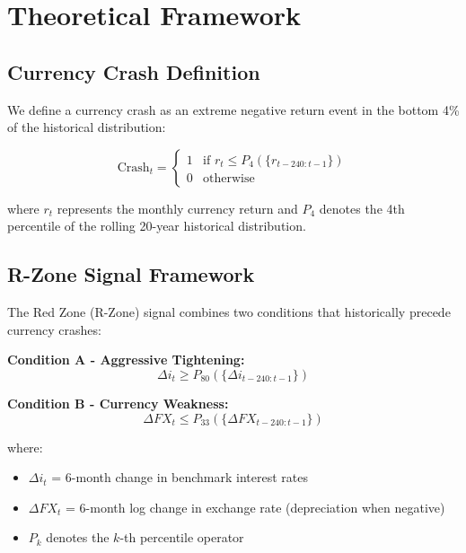 \documentclass[twocolumn,ieee]{arithmaxresearch}
\begin{document}
\section{Theoretical Framework}

\subsection{Currency Crash Definition}

We define a currency crash as an extreme negative return event in the bottom 4\% of the historical distribution:

\begin{equation}
\text{Crash}_t = \begin{cases}
1 & \text{if } r_t \leq P_4(\{r_{t-240:t-1}\}) \\
0 & \text{otherwise}
\end{cases}
\end{equation}

where $r_t$ represents the monthly currency return and $P_4$ denotes the 4th percentile of the rolling 20-year historical distribution.

\subsection{R-Zone Signal Framework}

The Red Zone (R-Zone) signal combines two conditions that historically precede currency crashes:

\textbf{Condition A - Aggressive Tightening:}
\begin{equation}
\Delta i_t \geq P_{80}(\{\Delta i_{t-240:t-1}\})
\end{equation}

\textbf{Condition B - Currency Weakness:}
\begin{equation}
\Delta FX_t \leq P_{33}(\{\Delta FX_{t-240:t-1}\})
\end{equation}

where:
\begin{itemize}
    \item $\Delta i_t$ = 6-month change in benchmark interest rates
    \item $\Delta FX_t$ = 6-month log change in exchange rate (depreciation when negative)
    \item $P_k$ denotes the $k$-th percentile operator
\end{itemize}
\end{document}
